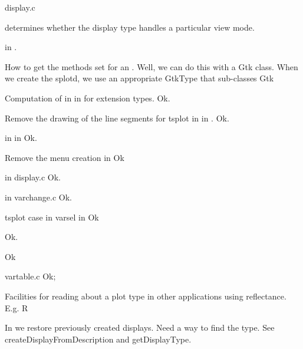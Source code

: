 \documentclass{article}
\begin{document}
display.c


 determines whether the display
type handles a particular view mode.

 in .





How to get the methods set for an .  Well, we can do
this with a Gtk class.  When we create the splotd, we use an
appropriate GtkType that sub-classes Gtk


Computation of  in 
in  for extension types.
Ok.

Remove the drawing of the line segments for tsplot in 
in .
Ok.


 in  in 
Ok.

Remove the menu creation in 
Ok

 in display.c
 Ok.

 in varchange.c
 Ok.

tsplot case in varsel in 
Ok

 Ok.

 Ok

vartable.c
 Ok;


Facilities for reading about a plot type in other applications
using reflectance. E.g. R

In  we restore previously created displays.  Need a way to
find the type. See createDisplayFromDescription and getDisplayType.
\end{document}
